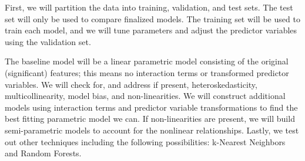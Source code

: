 \documentclass[12pt]{article}
\begin{document}
\noindent First, we will partition the data into training, validation, and test sets.  The test set will only be used to compare finalized models.  The training set will be used to train each model, and we will tune parameters and adjust the predictor variables using the validation set.

\noindent The baseline model will be a linear parametric model consisting of the original (significant) features; this means no interaction terms or transformed predictor variables.  We will check for, and address if present, heteroskedasticity, multicollinearity, model bias, and non-linearities. We will construct additional models using interaction terms and predictor variable transformations to find the best fitting parametric model we can.  If non-linearities are present, we will build semi-parametric models to account for the nonlinear relationships.  Lastly, we test out other techniques including the following possibilities: k-Nearest Neighbors and Random Forests.
\end{document}
